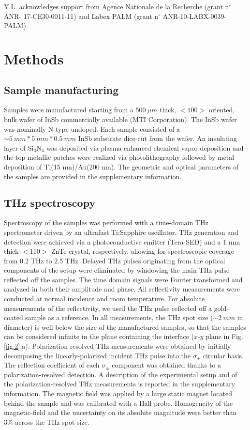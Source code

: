 \documentclass[twocolumn]{article}
\begin{document}
Y.L. acknowledges support from Agence Nationale de la Recherche (grant n$^{\circ}$ ANR- 17-CE30-0011-11) and Labex PALM (grant n$^{\circ}$ ANR-10-LABX-0039-PALM). 

\section*{Methods}

\subsection*{Sample manufacturing}

Samples were manufactured starting from a $500 \ \mu m$ thick, $<100>$ oriented, bulk wafer of InSb commercially available (MTI Corporation). The InSb wafer was nominally N-type undoped. Each sample consisted of a $\sim 5 \ mm*5 \ mm*0.5 \ mm$ InSb substrate dice-cut from the wafer. An insulating layer of Si$_3$N$_4$ was deposited via plasma enhanced chemical vapor deposition and the top metallic patches were realized via photolithography followed by metal deposition of Ti(15 nm)/Au(200 nm). The geometric and optical parameters of the samples are provided in the supplementary information.

\subsection*{THz spectroscopy}

Spectroscopy of the samples was performed with a time-domain THz spectrometer driven by an ultrafast Ti:Sapphire oscillator. THz generation and detection were achieved via a photoconductive emitter (Tera-SED) and a 1 mm thick $<110>$ ZnTe crystal, respectively, allowing for spectroscopic coverage from 0.2 THz to 2.5 THz. Delayed THz pulses originating from the optical components of the setup were eliminated by windowing the main THz pulse reflected off the samples. The time domain signals were Fourier transformed and analyzed in both their amplitude and phase. All reflectivity measurements were conducted at normal incidence and room temperature.  For absolute measurements of the reflectivity, we used the THz pulse reflected off a gold-coated sample as a reference. In all measurements, the THz spot size ($\sim 2 \ mm$ in diameter) is well below the size of the manufactured samples, so that the samples can be considered infinite in the plane containing the interface ($x$-$y$ plane in Fig. \ref{fig:2}.a).
Polarization-resolved THz measurements were obtained by initially decomposing the linearly-polarized incident THz pulse into the $\sigma_{\pm}$ circular basis. The reflection coefficient of each $\sigma_{\pm}$ component was obtained thanks to a polarization-resolved detection. A description of the experimental setup and of the polarization-resolved THz measurements is reported in the supplementary information.
The magnetic field was applied by a large static magnet located behind the sample and was calibrated with a Hall probe. Homogeneity of the magnetic-field and the uncertainty on its absolute magnitude were better than $3\%$ across the THz spot size.
\end{document}

